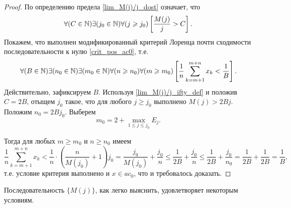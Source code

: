 \begin{proof}
	По определению предела \eqref{lim_M(j)/j_dost} означает, что
	\begin{equation}\label{lim_M(j)/j_ifty_def}
		\forall(C  \in\N)
		\exists(j_0\in\N)
		\forall(j \geq j_0)
		\left[
			\frac{M(j)}{j}>C
		\right]
		.
	\end{equation}
	Покажем, что выполнен модификированный критерий Лоренца почти сходимости последовательности к нулю
	\eqref{crit_pos_ac0}, т.е.
	\begin{equation}
		\forall(B  \in\N)
		\exists(n_0\in\N)
		\exists(m_0\in\N)
		\forall(n\geq n_0)
		\forall(m\geq m_0)
		\\
		\left[
			\frac{1}{n}
			\sum_{k=m+1}^{m+n} x_k
			<
			\frac{1}{B}
		\right]
		.
	\end{equation} Действительно, зафиксируем $B$.
	Используя \eqref{lim_M(j)/j_ifty_def} и положив $C=2B$,
	отыщем $j_0$ такое, что для любого $j\geq j_0$ выполнено
	$M(j)>2Bj$.
	Положим $n_0 = 2Bj_0$.
	Выберем
	$$
		m_0 = 2+\max_{1\leq j \leq j_0} E_j
		.
	$$

	Тогда для любых $m\geq m_0$ и $n\geq n_0$ имеем
	\begin{equation}
		\frac{1}{n} \sum_{k=m+1}^{m+n} x_k
		<
		\frac{1}{n} \cdot \left( \frac{n}{M(j_0)} + 1 \right) j_0
		=
		\frac{j_0}{M(j_0)} + \frac{j_0}{n}
		\leq
		\frac{1}{2B} + \frac{j_0}{n}
		\leq
		\frac{1}{2B} + \frac{j_0}{n_0}
		=
		\frac{1}{2B} + \frac{1}{2B}
		=
		\frac{1}{B}
		,
	\end{equation}
	т.е. условие критерия выполнено
	и $x\in ac_0$,
	что и требовалось доказать.
\end{proof}

Последовательность $\{M(j)\}$, как легко выяснить, удовлетворяет некоторым условиям.
